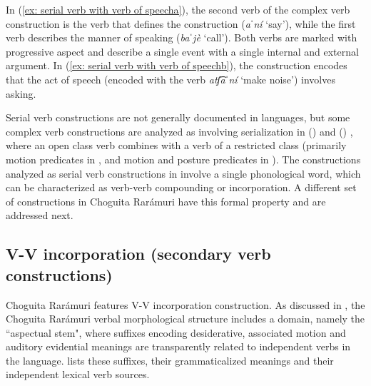         \label{ex: serial verb with verb of speechb}
    \z
\z

In (\ref{ex: serial verb with verb of speecha}), the second verb of the complex verb construction is the verb that defines the construction (\textit{aˈní} `say'), while the first verb describes the manner of speaking (\textit{baˈjè} `call'). Both verbs are marked with progressive aspect and describe a single event with a single internal and external argument. In (\ref{ex: serial verb with verb of speechb}), the construction encodes that the act of speech (encoded with the verb \textit{atʃ͡aˈní} `make noise') involves asking.

Serial verb constructions are not generally documented in  languages, but some complex verb constructions are analyzed as involving serialization in  () \citep{garcia2007serial} and  () \citep{thornes2011dimensions}, where an open class verb combines with a verb of a restricted class (primarily motion predicates in , and motion and posture predicates in ). The constructions analyzed as serial verb constructions in  involve a single phonological word, which can be characterized as verb-verb compounding or incorporation. A different set of constructions in Choguita Rarámuri have this formal property and are addressed next.

\subsection{V-V incorporation (secondary verb constructions)}
\label{subsec: V-V incorporation constructions}

Choguita Rarámuri features V-V incorporation construction. As discussed in , the Choguita Rarámuri verbal morphological structure includes a domain, namely the ``aspectual stem", where suffixes encoding desiderative, associated motion and auditory evidential meanings are transparently related to independent verbs in the language.  lists these suffixes, their grammaticalized meanings and their independent lexical verb sources.

